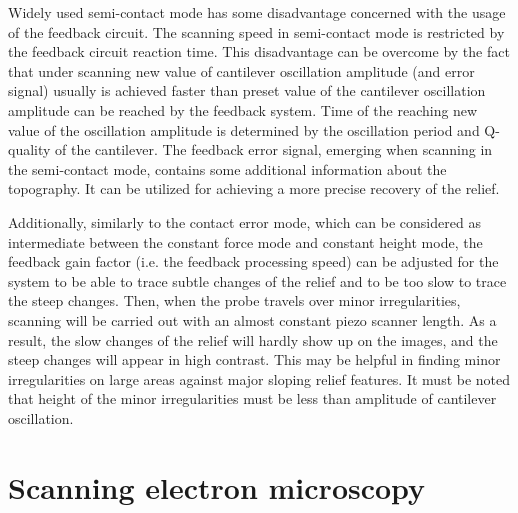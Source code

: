 Widely used semi-contact mode has some disadvantage concerned with the usage of the feedback circuit. The scanning speed in semi-contact mode is restricted by the feedback circuit reaction time. This disadvantage can be overcome by the fact that under scanning new value of cantilever oscillation amplitude (and error signal) usually is achieved faster than preset value of the cantilever oscillation amplitude can be reached by the feedback system. Time of the reaching new value of the oscillation amplitude is determined by the oscillation period and Q-quality of the cantilever.
The feedback error signal, emerging when scanning in the semi-contact mode, contains some additional information about the topography. It can be utilized for achieving a more precise recovery of the relief. 

Additionally, similarly to the contact error mode, which can be considered as intermediate between the constant force mode and constant height mode, the feedback gain factor (i.e. the feedback processing speed) can be adjusted for the system to be able to trace subtle changes of the relief and to be too slow to trace the steep changes. Then, when the probe travels over minor irregularities, scanning will be carried out with an almost constant piezo scanner length. As a result, the slow changes of the relief will hardly show up on the images, and the steep changes will appear in high contrast. This may be helpful in finding minor irregularities on large areas against major sloping relief features. It must be noted that height of the minor irregularities must be less than amplitude of cantilever oscillation.

\section{Scanning electron microscopy}


